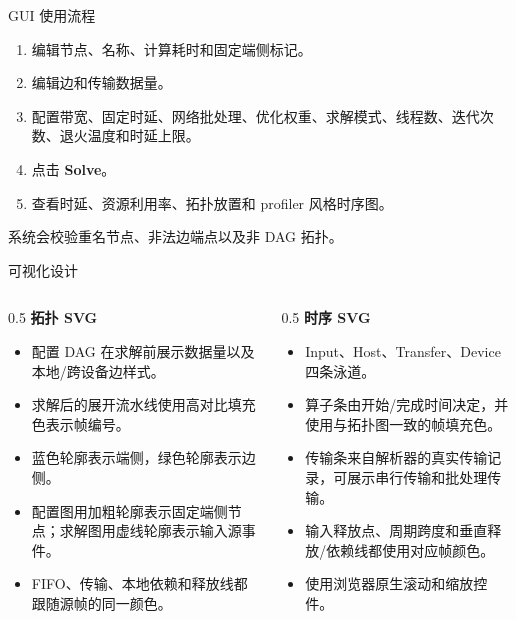 \documentclass[aspectratio=169]{ctexbeamer}
\begin{document}
\begin{frame}{GUI 使用流程}
  \begin{enumerate}
    \item 编辑节点、名称、计算耗时和固定端侧标记。
    \item 编辑边和传输数据量。
    \item 配置带宽、固定时延、网络批处理、优化权重、求解模式、线程数、迭代次数、退火温度和时延上限。
    \item 点击 \textbf{Solve}。
    \item 查看时延、资源利用率、拓扑放置和 profiler 风格时序图。
  \end{enumerate}
  \vspace{0.5em}
  系统会校验重名节点、非法边端点以及非 DAG 拓扑。
\end{frame}

\begin{frame}{可视化设计}
  \begin{columns}[T,onlytextwidth]
    \begin{column}{0.5\textwidth}
      \textbf{拓扑 SVG}
      \begin{itemize}
        \item 配置 DAG 在求解前展示数据量以及本地/跨设备边样式。
        \item 求解后的展开流水线使用高对比填充色表示帧编号。
        \item 蓝色轮廓表示端侧，绿色轮廓表示边侧。
        \item 配置图用加粗轮廓表示固定端侧节点；求解图用虚线轮廓表示输入源事件。
        \item FIFO、传输、本地依赖和释放线都跟随源帧的同一颜色。
      \end{itemize}
    \end{column}
    \begin{column}{0.5\textwidth}
      \textbf{时序 SVG}
      \begin{itemize}
        \item Input、Host、Transfer、Device 四条泳道。
        \item 算子条由开始/完成时间决定，并使用与拓扑图一致的帧填充色。
        \item 传输条来自解析器的真实传输记录，可展示串行传输和批处理传输。
        \item 输入释放点、周期跨度和垂直释放/依赖线都使用对应帧颜色。
        \item 使用浏览器原生滚动和缩放控件。
      \end{itemize}
    \end{column}
  \end{columns}
\end{frame}
\end{document}
